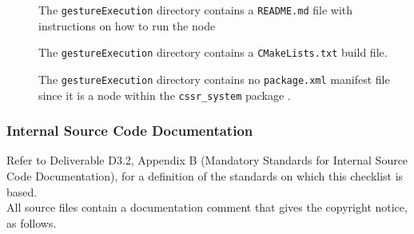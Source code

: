 \documentclass{CSSRforAfrica}
\newcommand{\checkboxChecked}{\fbox{\ding{51}}} %
\begin{document}
\begin{description}
\item[\checkboxChecked] The {\small \verb+gestureExecution+} directory contains  a {\small \verb+README.md+} file with  instructions on how to run the node 
\item[\checkboxChecked] The {\small \verb+gestureExecution+} directory contains  a {\small \verb+CMakeLists.txt+} build file.
\item[\checkboxChecked] The {\small \verb+gestureExecution+} directory contains  no {\small \verb+package.xml+} manifest file since it is a node within the {\small \verb+cssr_system+} package .

\end{description}


 
 
\subsubsection{Internal Source Code Documentation}
\label{subsubsection:gesture_execution_documentation_standards}  
 
Refer to Deliverable D3.2, Appendix B (Mandatory Standards for Internal Source Code Documentation), for a definition of the standards on which this checklist is based.\\

\noindent All source files contain a documentation comment that gives the copyright notice, as follows.
 
\end{document}
